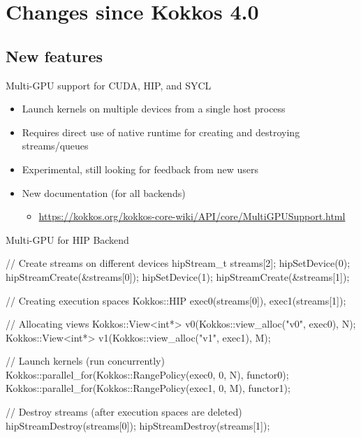 \section{Changes since Kokkos 4.0}

\subsection{New features}

\begin{frame}[fragile]{Multi-GPU support for CUDA, HIP, and SYCL}
  \begin{itemize}
    \item Launch kernels on multiple devices from a single host process
    \item Requires direct use of native runtime for creating and destroying streams/queues
    \item Experimental, still looking for feedback from new users
    \item New documentation (for all backends)  
      \begin{itemize} 
        \item[] \url{https://kokkos.org/kokkos-core-wiki/API/core/MultiGPUSupport.html}
      \end{itemize}
  \end{itemize}
\end{frame}

\begin{frame}[fragile]{Multi-GPU for HIP Backend}
  \begin{code}[keywords={auto}]
// Create streams on different devices
hipStream_t streams[2];
hipSetDevice(0); hipStreamCreate(&streams[0]);
hipSetDevice(1); hipStreamCreate(&streams[1]);
{
  // Creating execution spaces 
  Kokkos::HIP exec0(streams[0]), exec1(streams[1]);

  // Allocating views
  Kokkos::View<int*> v0(Kokkos::view_alloc("v0", exec0), N);
  Kokkos::View<int*> v1(Kokkos::view_alloc("v1", exec1), M);

  // Launch kernels (run concurrently)
  Kokkos::parallel_for(Kokkos::RangePolicy(exec0, 0, N), functor0);
  Kokkos::parallel_for(Kokkos::RangePolicy(exec1, 0, M), functor1);
}
// Destroy streams (after execution spaces are deleted)
hipStreamDestroy(streams[0]); hipStreamDestroy(streams[1]);
  \end{code}
\end{frame}

